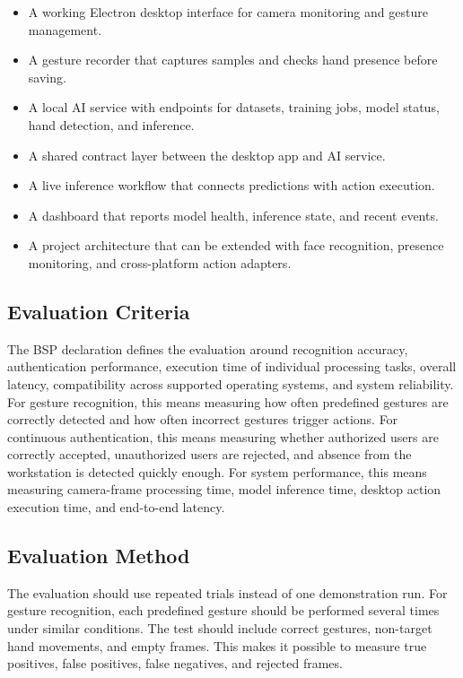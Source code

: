\documentclass[10pt,twocolumn]{article}
\begin{document}
\begin{itemize}[leftmargin=*]
  \item A working Electron desktop interface for camera monitoring and gesture management.
  \item A gesture recorder that captures samples and checks hand presence before saving.
  \item A local AI service with endpoints for datasets, training jobs, model status, hand detection, and inference.
  \item A shared contract layer between the desktop app and AI service.
  \item A live inference workflow that connects predictions with action execution.
  \item A dashboard that reports model health, inference state, and recent events.
  \item A project architecture that can be extended with face recognition, presence monitoring, and cross-platform action adapters.
\end{itemize}

\subsection{Evaluation Criteria}
The BSP declaration defines the evaluation around recognition accuracy, authentication performance, execution time of individual processing tasks, overall latency, compatibility across supported operating systems, and system reliability.
For gesture recognition, this means measuring how often predefined gestures are correctly detected and how often incorrect gestures trigger actions.
For continuous authentication, this means measuring whether authorized users are correctly accepted, unauthorized users are rejected, and absence from the workstation is detected quickly enough.
For system performance, this means measuring camera-frame processing time, model inference time, desktop action execution time, and end-to-end latency.

\subsection{Evaluation Method}
The evaluation should use repeated trials instead of one demonstration run.
For gesture recognition, each predefined gesture should be performed several times under similar conditions.
The test should include correct gestures, non-target hand movements, and empty frames.
This makes it possible to measure true positives, false positives, false negatives, and rejected frames.
\end{document}
